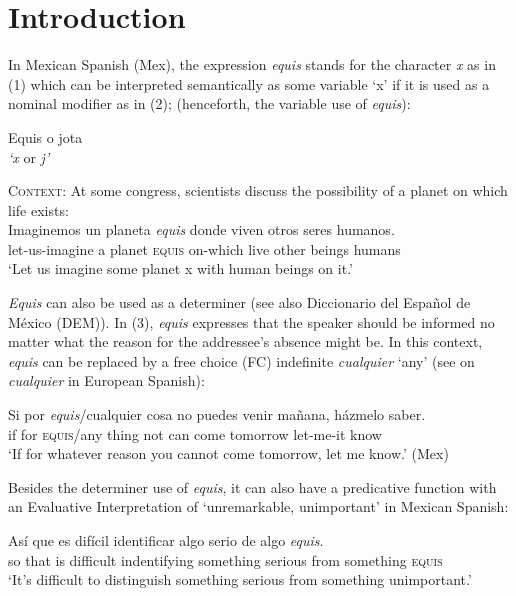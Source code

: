 \documentclass[output=paper
,modfonts
,nonflat]{langsci/langscibook}
\author{Olga Kellert\affiliation{Georg-August-Universität Göttingen}}
\begin{document}
\maketitle
\section{Introduction}\label{sec:kellert:1}
In Mexican Spanish (Mex), the expression \textit{equis} stands for the character \textit{x} as in (1) which can be interpreted semantically as some variable ‘x’ if it is used as a nominal modifier as in (2); (henceforth, the variable use of \textit{equis}):

\ea
Equis o jota\\
\textit{`x} or \textit{j'}
\z

\ea
\textsc{Context}: At some congress, scientists discuss the possibility of a planet on which life exists:\\
\gll Imaginemos un planeta \textit{equis} donde viven otros seres humanos.\\
let-us-imagine a planet \textsc{equis} on-which live other beings humans\\
\glt `Let us imagine some planet x with human beings on it.'
\z

\textit{Equis} can also be used as a determiner (see also Diccionario del Español de México (\nocite{DEM}DEM)). In (3), \textit{equis} expresses that the speaker should be informed no matter what the reason for the addressee’s absence might be. In this context, \textit{equis} can be replaced by a free choice (FC) indefinite \textit{cualquier} ‘any’ (see \citealt{AM2011} on \textit{cualquier} in European Spanish):

\ea
\gll Si por \textit{equis}/cualquier cosa no puedes venir mañana, házmelo saber.\\
if for \textsc{equis}/any thing not can come tomorrow let-me-it know\\
\glt ‘If for whatever reason you cannot come tomorrow, let me know.’ (Mex)
\z

Besides the determiner use of \textit{equis}, it can also have a predicative function with an Evaluative Interpretation of ‘unremarkable, unimportant’ in Mexican Spanish:

\ea
\gll Así que es difícil identificar algo serio de algo \textit{equis}.\\
so that is difficult indentifying something serious from something \textsc{equis}\\
\glt ‘It’s difficult to distinguish something serious from something unimportant.’
\z
\end{document}

